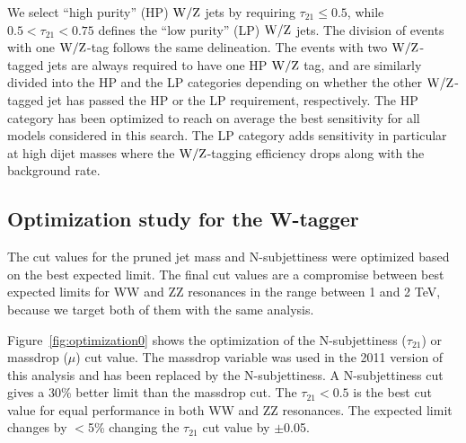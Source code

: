 
We select ``high purity'' (HP) ${\rm W}/{\rm Z}$ jets by
requiring $\tau_{21} \leq 0.5$, while $ 0.5 <
\tau_{21} < 0.75$ defines the ``low purity'' (LP) ${\rm W}/{\rm Z}$ jets.
%
The division of events with one ${\rm W}/{\rm Z}$-tag follows the same delineation.
%
The events with two ${\rm W}/{\rm Z}$-tagged jets are always required 
to have one HP ${\rm W}/{\rm Z}$ tag, and are similarly divided
into the HP and the LP categories depending on whether
the other ${\rm W}/{\rm Z}$-tagged jet has passed the HP or the LP requirement, 
respectively.
%
The HP category has been optimized to reach on average the
best sensitivity for all models considered in this search.  The LP 
category adds sensitivity in particular at high dijet masses
where the ${\rm W}/{\rm Z}$-tagging efficiency drops along with the
background rate.

\subsection{Optimization study for the W-tagger}
\label{sec:optimal}

The cut values for the pruned jet mass and N-subjettiness were optimized based on the best expected limit.
The final cut values are a compromise between best expected limits for WW and ZZ resonances in the range between 1 and 2 TeV, because we target both of them with the same analysis.

Figure~\ref{fig:optimization0} shows the optimization of the N-subjettiness ($\tau_{21}$) or massdrop ($\mu$) cut value.
The massdrop variable was used in the 2011 version of this analysis and has been replaced by the 
N-subjettiness.
A N-subjettiness cut gives a 30\% better limit than the massdrop cut.
The $\tau_{21}<0.5$ is the best cut value for equal performance in both WW and ZZ resonances.
The expected limit changes by $<$5\% changing the $\tau_{21}$ cut value by $\pm$0.05.

